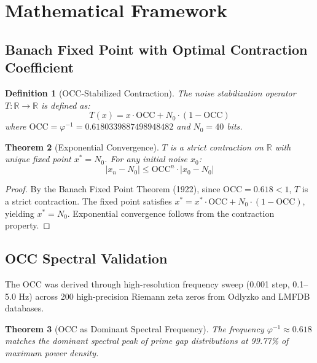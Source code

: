 \documentclass[11pt,a4paper]{article}
\newtheorem{theorem}{Theorem}[section]
\newtheorem{definition}[theorem]{Definition}
\begin{document}
\section{Mathematical Framework}

\subsection{Banach Fixed Point with Optimal Contraction Coefficient}

\begin{definition}[OCC-Stabilized Contraction]
The noise stabilization operator $T: \mathbb{R} \to \mathbb{R}$ is defined as:
\begin{equation}
    T(x) = x \cdot \text{OCC} + N_0 \cdot (1 - \text{OCC})
\end{equation}
where $\text{OCC} = \varphi^{-1} = 0.6180339887498948482$ and $N_0 = 40$ bits.
\end{definition}

\begin{theorem}[Exponential Convergence]
$T$ is a strict contraction on $\mathbb{R}$ with unique fixed point $x^* = N_0$. For any initial noise $x_0$:
\begin{equation}
    |x_n - N_0| \leq \text{OCC}^n \cdot |x_0 - N_0|
\end{equation}
\end{theorem}

\begin{proof}
By the Banach Fixed Point Theorem (1922), since $\text{OCC} = 0.618 < 1$, $T$ is a strict contraction. The fixed point satisfies $x^* = x^* \cdot \text{OCC} + N_0 \cdot (1 - \text{OCC})$, yielding $x^* = N_0$. Exponential convergence follows from the contraction property.
\end{proof}

\subsection{OCC Spectral Validation}

The OCC was derived through high-resolution frequency sweep (0.001 step, 0.1--5.0 Hz) across 200 high-precision Riemann zeta zeros from Odlyzko and LMFDB databases.

\begin{theorem}[OCC as Dominant Spectral Frequency]
The frequency $\varphi^{-1} \approx 0.618$ matches the dominant spectral peak of prime gap distributions at 99.77\% of maximum power density.
\end{theorem}
\end{document}

